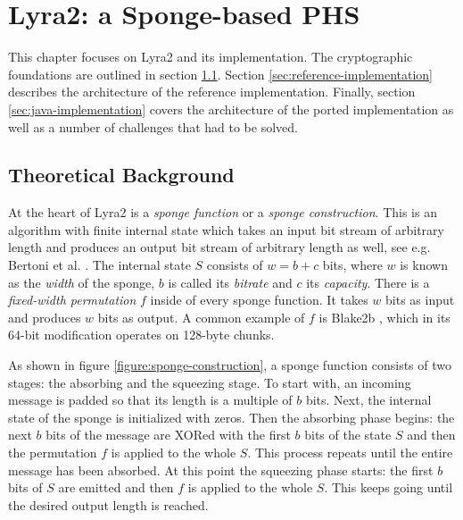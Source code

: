 \chapter{Lyra2: a Sponge-based PHS}
\label{sec:implementation-details}
\label{chapter:lyra2}

This chapter focuses on Lyra2 and its implementation. The cryptographic foundations are outlined in section \ref{sec:lyra2-brief-description}. Section \ref{sec:reference-implementation} describes the architecture of the reference implementation. Finally, section \ref{sec:java-implementation} covers the architecture of the ported implementation as well as a number of challenges that had to be solved.

\section{Theoretical Background}
\label{sec:lyra2-brief-description}

At the heart of Lyra2 is a \emph{sponge function} or a \emph{sponge construction}. This is an algorithm with finite internal state which takes an input bit stream of arbitrary length and produces an output bit stream of arbitrary length as well, see e.g. Bertoni et al. \cite{bertoni2007sponge}. The internal state \(S\) consists of \(w = b + c\) bits, where \(w\) is known as the \emph{width} of the sponge, \(b\) is called its \emph{bitrate} and \(c\) its \emph{capacity}. There is a \emph{fixed-width permutation} \(f\) inside of every sponge function. It takes \(w\) bits as input and produces \(w\) bits as output. A common example of \(f\) is Blake2b \cite{aumasson:2013:blake2}, which in its 64-bit modification operates on 128-byte chunks.

As shown in figure \ref{figure:sponge-construction}, a sponge function consists of two stages: the absorbing and the squeezing stage. To start with, an incoming message is padded so that its length is a multiple of \(b\) bits. Next, the internal state of the sponge is initialized with zeros. Then the absorbing phase begins: the next \(b\) bits of the message are XORed with the first \(b\) bits of the state \(S\) and then the permutation \(f\) is applied to the whole \(S\). This process repeats until the entire message has been absorbed. At this point the squeezing phase starts: the first \(b\) bits of \(S\) are emitted and then \(f\) is applied to the whole \(S\). This keeps going until the desired output length is reached.

